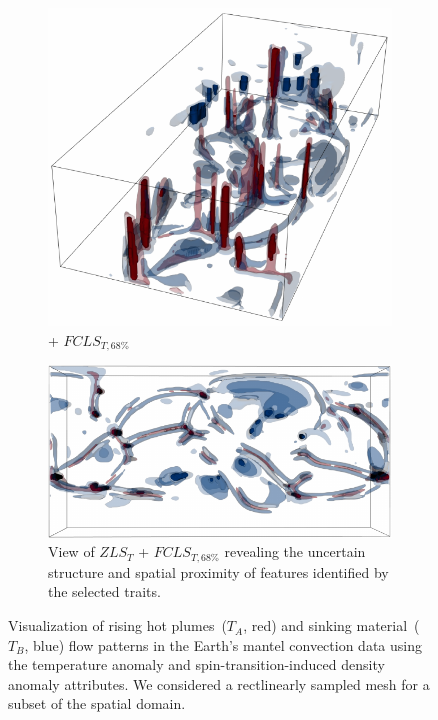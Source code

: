 \begin{figure}[!h]
\begin{subfigure}{0.195\linewidth}
\includegraphics[width=\linewidth]{Images/Mantel/fcls_68.pdf}
\vspace{-3mm}
\caption{+ $FCLS_{T,68\%}$}
\label{fig:mantel_fcls_68}
\end{subfigure}
\begin{subfigure}{0.29\linewidth}
\centering
\includegraphics[width=0.9\linewidth]{Images/Mantel/fcls_68_v2.pdf}
\caption{View of $ZLS_{T}$ + $FCLS_{T,68\%}$ revealing the uncertain structure and spatial proximity of features identified by the selected traits.}
\label{fig:mantel_fcls_68_v2}
\end{subfigure}
\caption{Visualization of rising hot plumes~($T_{A}$, red) and sinking material~($T_{B}$, blue) flow patterns in the Earth's mantel convection data using the temperature anomaly and spin-transition-induced density anomaly attributes. We considered a rectlinearly sampled mesh for a subset of the spatial domain.}
\label{fig:mantel}
\end{figure}
